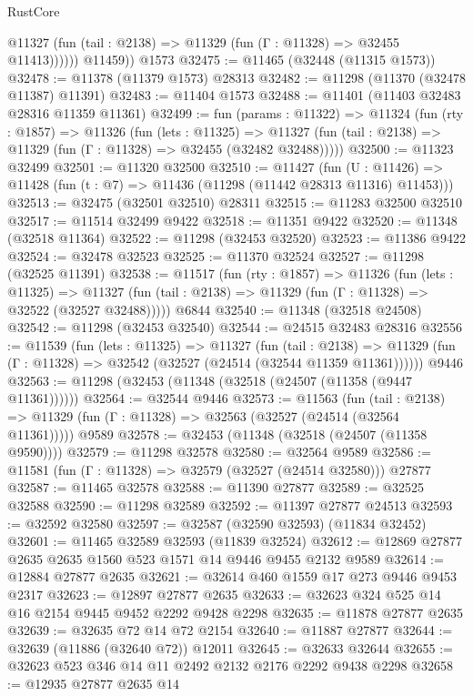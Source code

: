\begin{lexlean}{RustCore}
\begin{coremodule}
              @11327 (fun (tail : @2138) => @11329 (fun (Γ : @11328) => @32455 @11413))))))
        @11459))
    @1573
@32475 := @11465 (@32448 (@11315 @1573))
@32478 := @11378 (@11379 @1573) @28313
@32482 := @11298 (@11370 (@32478 @11387) @11391)
@32483 := @11404 @1573
@32488 := @11401 (@11403 @32483 @28316 @11359 @11361)
@32499 := fun (params : @11322) =>
  @11324
    (fun (rty : @1857) =>
    @11326
      (fun (lets : @11325) =>
      @11327 (fun (tail : @2138) => @11329 (fun (Γ : @11328) => @32455 (@32482 @32488)))))
@32500 := @11323 @32499
@32501 := @11320 @32500
@32510 := @11427
    (fun (U : @11426) => @11428 (fun (t : @7) => @11436 (@11298 (@11442 @28313 @11316) @11453)))
@32513 := @32475 (@32501 @32510) @28311
@32515 := @11283 @32500 @32510
@32517 := @11514 @32499 @9422
@32518 := @11351 @9422
@32520 := @11348 (@32518 @11364)
@32522 := @11298 (@32453 @32520)
@32523 := @11386 @9422
@32524 := @32478 @32523
@32525 := @11370 @32524
@32527 := @11298 (@32525 @11391)
@32538 := @11517
    (fun (rty : @1857) =>
    @11326
      (fun (lets : @11325) =>
      @11327 (fun (tail : @2138) => @11329 (fun (Γ : @11328) => @32522 (@32527 @32488)))))
    @6844
@32540 := @11348 (@32518 @24508)
@32542 := @11298 (@32453 @32540)
@32544 := @24515 @32483 @28316
@32556 := @11539
    (fun (lets : @11325) =>
    @11327
      (fun (tail : @2138) =>
      @11329 (fun (Γ : @11328) => @32542 (@32527 (@24514 (@32544 @11359 @11361))))))
    @9446
@32563 := @11298 (@32453 (@11348 (@32518 (@24507 (@11358 (@9447 @11361))))))
@32564 := @32544 @9446
@32573 := @11563
    (fun (tail : @2138) => @11329 (fun (Γ : @11328) => @32563 (@32527 (@24514 (@32564 @11361)))))
    @9589
@32578 := @32453 (@11348 (@32518 (@24507 (@11358 @9590))))
@32579 := @11298 @32578
@32580 := @32564 @9589
@32586 := @11581 (fun (Γ : @11328) => @32579 (@32527 (@24514 @32580))) @27877
@32587 := @11465 @32578
@32588 := @11390 @27877
@32589 := @32525 @32588
@32590 := @11298 @32589
@32592 := @11397 @27877 @24513
@32593 := @32592 @32580
@32597 := @32587 (@32590 @32593) (@11834 @32452)
@32601 := @11465 @32589 @32593 (@11839 @32524)
@32612 := @12869 @27877 @2635 @2635 @1560 @523 @1571 @14 @9446 @9455 @2132 @9589
@32614 := @12884 @27877 @2635
@32621 := @32614 @460 @1559 @17 @273 @9446 @9453 @2317
@32623 := @12897 @27877 @2635
@32633 := @32623 @324 @525 @14 @16 @2154 @9445 @9452 @2292 @9428 @2298
@32635 := @11878 @27877 @2635
@32639 := @32635 @72 @14 @72 @2154
@32640 := @11887 @27877
@32644 := @32639 (@11886 (@32640 @72)) @12011
@32645 := @32633 @32644
@32655 := @32623 @523 @346 @14 @11 @2492 @2132 @2176 @2292 @9438 @2298
@32658 := @12935 @27877 @2635 @14

\end{coremodule}
\end{lexlean}
